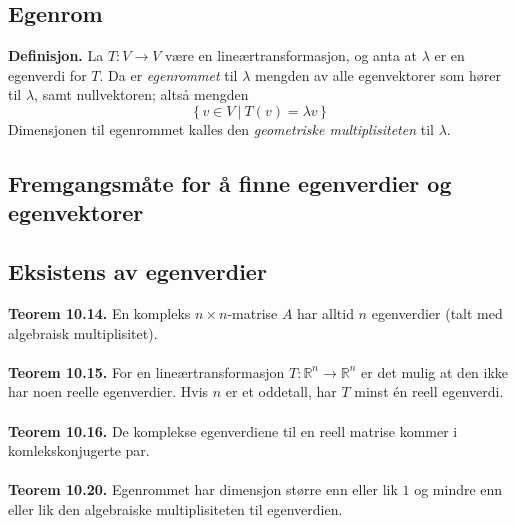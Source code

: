 \documentclass{article}
\begin{document}
\subsection{Egenrom}
\textbf{Definisjon.} La $T: V \rightarrow V$ være en lineærtransformasjon, og anta at $\lambda$ er en egenverdi for $T$. Da er \textit{egenrommet} til $\lambda$ mengden av alle egenvektorer som hører til $\lambda$, samt nullvektoren; altså mengden
\[ \{\, v \in V \ | \ T(v) = \lambda v \, \} \]
Dimensjonen til egenrommet kalles den \textit{geometriske multiplisiteten} til $\lambda$.


\subsection{Fremgangsmåte for å finne egenverdier og egenvektorer}


\subsection{Eksistens av egenverdier}
\textbf{Teorem 10.14.} En kompleks $n \times n$-matrise $A$ har alltid $n$ egenverdier (talt med algebraisk multiplisitet).
\\\\
\textbf{Teorem 10.15.} For en lineærtransformasjon $T: \mathbb{R}^n \rightarrow \mathbb{R}^n$ er det mulig at den ikke har noen reelle egenverdier. Hvis $n$ er et oddetall, har $T$ minst én reell egenverdi.
\\\\
\textbf{Teorem 10.16.} De komplekse egenverdiene til en reell matrise kommer i komlekskonjugerte par.
\\\\
\textbf{Teorem 10.20.} Egenrommet har dimensjon større enn eller lik $1$ og mindre enn eller lik den algebraiske multiplisiteten til egenverdien.

\clearpage
\end{document}
